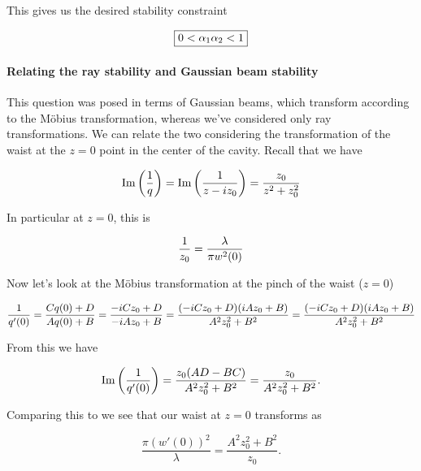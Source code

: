 {This gives us the desired stability constraint

\begin{equation}\label{eqn:problemSet4Problem2:1060}
\boxed{
0 < \alpha_1 \alpha_2 < 1
}
\end{equation}

\paragraph{Relating the ray stability and Gaussian beam stability}

This question was posed in terms of Gaussian beams, which transform according to the M\"obius transformation, whereas we've considered only ray transformations.  We can relate the two considering the transformation of the waist at the $z = 0$ point in the center of the cavity.  Recall that we have

\begin{dmath}\label{eqn:problemSet4Problem2:1180}
\Imag\left( \inv{q} \right)
= \Imag \left( \inv{z - i z_0} \right)
= \frac{z_0}{z^2 + z_0^2}
\end{dmath}

In particular at $z = 0$, this is

\begin{dmath}\label{eqn:problemSet4Problem2:1200}
\inv{z_0} = \frac{\lambda}{\pi w^2(0)}
\end{dmath}

Now let's look at the M\"obius transformation at the pinch of the waist ($z = 0$)

\begin{dmath}\label{eqn:problemSet4Problem2:1220}
\inv{q'(0)}
= \frac{C q(0) + D}{A q(0) + B}
= \frac{-i C z_0 + D}{-i A z_0 + B}
= \frac{(-i C z_0 + D)( i A z_0 + B)}{
A^2 z_0^2 + B^2
}
=
\frac{(-i C z_0 + D)( i A z_0 + B)}{
A^2 z_0^2 + B^2
}
\end{dmath}

From this we have

\begin{dmath}\label{eqn:problemSet4Problem2:1240}
\Imag\left(
\inv{q'(0)}
\right)
=
\frac{ z_0 (A D - B C)}
{
A^2 z_0^2 + B^2
}
=
\frac{ z_0 }
{
A^2 z_0^2 + B^2
}.
\end{dmath}

Comparing this to  we see that our waist at $z = 0$ transforms as

\begin{dmath}\label{eqn:problemSet4Problem2:1260}
\frac
{\pi (w'(0))^2}
{\lambda}
=
\frac
{
A^2 z_0^2 + B^2
}
{ z_0 }.
\end{dmath}

}
